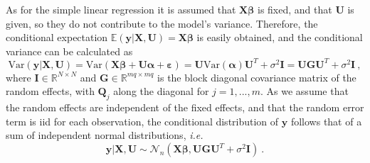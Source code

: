 As for the simple linear regression it is assumed that $\mathbf{X}\boldsymbol{\beta}$ is fixed, and that $\mathbf{U}$ is given, so they do not contribute to the model's variance. Therefore, the conditional expectation $\mathbb{E}(\mathbf{y} \lvert \mathbf{X}, \mathbf{U}) = \mathbf{X}\boldsymbol{\beta}$ is easily obtained, and the conditional variance can be calculated as
\begin{equation} \label{eq:cond_var_LMM}
    \text{Var}(\mathbf{y} \lvert \mathbf{X}, \mathbf{U}) = \text{Var}(\mathbf{X}\boldsymbol{\beta}  + \mathbf{U}\boldsymbol{\alpha} + \boldsymbol{\varepsilon}) = \mathbf{U}\text{Var}(\boldsymbol{\alpha})\mathbf{U}^T + \sigma^2\mathbf{I} = \mathbf{U}\mathbf{G}\mathbf{U}^T + \sigma^2\mathbf{I} \ ,
\end{equation}
where $\mathbf{I}\in \mathbb{R}^{N\times N}$ and $\mathbf{G} \in \mathbb{R}^{mq \times mq}$ is the block diagonal covariance matrix of the random effects, with $\mathbf{Q}_j$ along the diagonal for $j=1, ..., m$. 
As we assume that the random effects are independent of the fixed effects, and that the random error term is iid for each observation, the conditional distribution of $\mathbf{y}$ follows that of a sum of independent normal distributions, \textit{i.e.}
\begin{equation}
    \mathbf{y} \lvert \mathbf{X}, \mathbf{U} \sim \mathcal{N}_n(\mathbf{X}\boldsymbol{\beta}, \mathbf{U}\mathbf{G}\mathbf{U}^T + \sigma^2\mathbf{I}) \ .
\end{equation}


